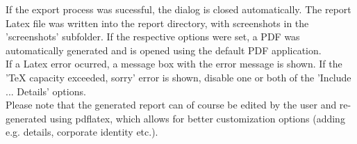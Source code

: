 If the export process was sucessful, the dialog is closed automatically. The report Latex file was written into the report directory, with screenshots in the 'screenshots' subfolder. If the respective options were set, a PDF was automatically generated and is opened using the default PDF application. \\

If a Latex error ocurred, a message box with the error message is shown. If the 'TeX capacity exceeded, sorry' error is shown, disable one or both of the 'Include ... Details' options.\\

Please note that the generated report can of course be edited by the user and re-generated using pdflatex, which allows for better customization options (adding e.g. details, corporate identity etc.).


